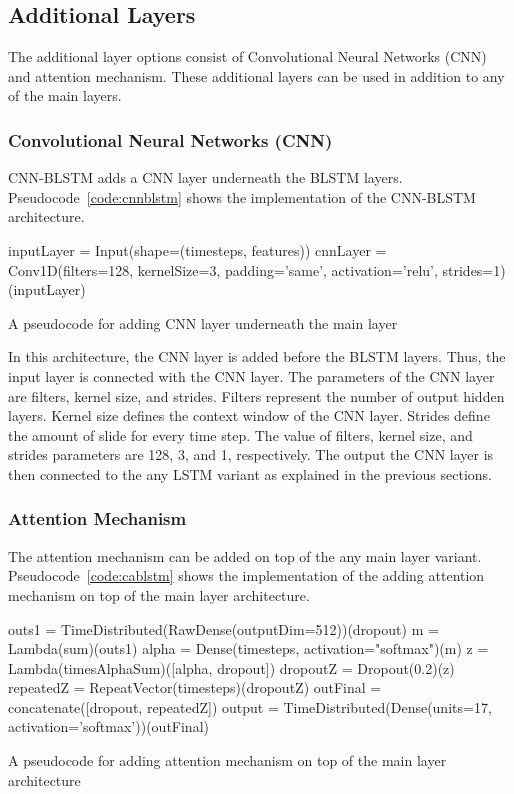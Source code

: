 \subsection{Additional Layers}
The additional layer options consist of Convolutional Neural Networks (CNN) and attention mechanism. These additional layers can be used in addition to any of the main layers.

\subsubsection{Convolutional Neural Networks (CNN)}
CNN-BLSTM adds a CNN layer underneath the BLSTM layers. Pseudocode~\ref{code:cnnblstm} shows the implementation of the CNN-BLSTM architecture.
\begin{kode}
	inputLayer = Input(shape=(timesteps, features))\;
	cnnLayer = Conv1D(filters=128, kernelSize=3, padding='same', activation='relu', strides=1)(inputLayer)\;
	\caption{A pseudocode for adding CNN layer underneath the main layer}
	\label{code:cnnblstm}
\end{kode}

In this architecture, the CNN layer is added before the BLSTM layers. Thus, the input layer is connected with the CNN layer. The parameters of the CNN layer are filters, kernel size, and strides. Filters represent the number of output hidden layers. Kernel size defines the context window of the CNN layer. Strides define the amount of slide for every time step. The value of filters, kernel size, and strides parameters are 128, 3, and 1, respectively. The output the CNN layer is then connected to the any LSTM variant as explained in the previous sections.

\subsubsection{Attention Mechanism}
The attention mechanism can be added on top of the any main layer variant. Pseudocode~\ref{code:cablstm} shows the implementation of the adding attention mechanism on top of the main layer architecture.
\begin{kode}
	outs1 = TimeDistributed(RawDense(outputDim=512))(dropout)\;
	m = Lambda(sum)(outs1)\;
	alpha = Dense(timesteps, activation="softmax")(m)\;
	z = Lambda(timesAlphaSum)([alpha, dropout])\;
	dropoutZ = Dropout(0.2)(z)\;
	repeatedZ = RepeatVector(timesteps)(dropoutZ)\;
	outFinal = concatenate([dropout, repeatedZ])\;	
	output = TimeDistributed(Dense(units=17, activation='softmax'))(outFinal)\;
	
	\caption{A pseudocode for adding attention mechanism on top of the main layer architecture}
	\label{code:cablstm}
\end{kode}


